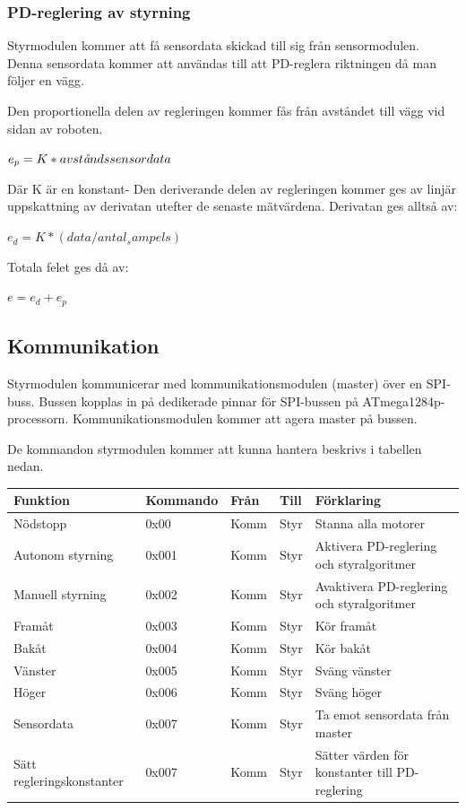 \documentclass[a4paper,12pt,fleqn]{article}
\begin{document}
\subsubsection{PD-reglering av styrning}
Styrmodulen kommer att få sensordata skickad till sig från sensormodulen. Denna sensordata kommer att användas till att PD-reglera riktningen då man följer en vägg. 

Den proportionella delen av regleringen kommer fås från avståndet till vägg vid sidan av roboten. 

$ e_p = K*avst\text{\it{å}}ndssensordata $

Där K är en konstant- Den deriverande delen av regleringen kommer ges av linjär uppskattning av derivatan utefter de senaste mätvärdena. Derivatan ges alltså av: 

$ e_d = K*(data/antal_sampels) $

Totala felet ges då av: 

$e = e_d + e_p$
\newpage



\subsection{Kommunikation}

Styrmodulen kommunicerar med kommunikationsmodulen (master) över en SPI-buss. Bussen kopplas in på dedikerade pinnar för SPI-bussen på ATmega1284p-processorn. Kommunikationsmodulen kommer att agera master på bussen. 

De kommandon styrmodulen kommer att kunna hantera beskrivs i tabellen nedan. 

\begin{tabular}{| p{} | p{} | p{} | p{} | p{} |}
	\hline
	\rowcolor{listinggray}
	\textbf{Funktion} & \textbf{Kommando} & \textbf{Från} & \textbf{Till} & \textbf{Förklaring} \\ \hline
	Nödstopp & 0x00 & Komm & Styr & Stanna alla motorer \\ \hline
	Autonom styrning & 0x001 & Komm & Styr & Aktivera PD-reglering och styralgoritmer \\ \hline
	Manuell styrning & 0x002 & Komm & Styr & Avaktivera PD-reglering och styralgoritmer \\ \hline
	Framåt & 0x003 & Komm & Styr & Kör framåt \\ \hline
	Bakåt & 0x004 & Komm & Styr & Kör bakåt \\ \hline
	Vänster & 0x005 & Komm & Styr & Sväng vänster \\ \hline
	Höger & 0x006 & Komm & Styr & Sväng höger \\ \hline
	Sensordata & 0x007 & Komm & Styr & Ta emot sensordata från master \\ \hline
	Sätt regleringskonstanter & 0x007 & Komm & Styr & Sätter värden för konstanter till PD-reglering \\ \hline
\end{tabular}
\end{document}
